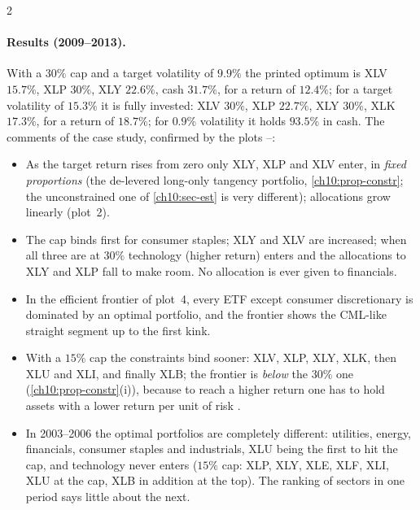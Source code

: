 \begin{paracol}{2}
\paragraph{Results (2009--2013).} With a $30\%$ cap and a target volatility of $9.9\%$ the printed optimum is XLV $15.7\%$,
XLP $30\%$, XLY $22.6\%$, cash $31.7\%$, for a return of $12.4\%$; for a target volatility of $15.3\%$ it is fully
invested: XLV $30\%$, XLP $22.7\%$, XLY $30\%$, XLK $17.3\%$, for a return of $18.7\%$; for $0.9\%$ volatility it
holds $93.5\%$ in cash. The comments of the case study, confirmed by the plots --:
\begin{itemize}
  \item As the target return rises from zero only XLY, XLP and XLV enter, in \emph{fixed proportions} (the de-levered
        long-only tangency portfolio, \cref{ch10:prop-constr}; the unconstrained one of \cref{ch10:sec-est} is very
        different); allocations grow linearly (plot~2).
  \item The cap binds first for consumer staples; XLY and XLV are increased; when all three are at $30\%$ technology
        (higher return) enters and the allocations to XLY and XLP fall to make room. No allocation is ever given to financials.
  \item In the efficient frontier of plot~4, every ETF except consumer discretionary is dominated by an optimal
        portfolio, and the frontier shows the CML-like straight segment up to the first kink.
  \item With a $15\%$ cap the constraints bind sooner: XLV, XLP, XLY, XLK, then XLU and XLI, and finally XLB; the frontier is
        \emph{below} the $30\%$ one (\cref{ch10:prop-constr}(i)), because to reach a higher return one has to
        hold assets with a lower return per unit of risk .
  \item In 2003--2006 the optimal portfolios are completely different: utilities, energy, financials, consumer
        staples and industrials, XLU being the first to hit the cap, and technology never enters ($15\%$ cap:
        XLP, XLY, XLE, XLF, XLI, XLU at the cap, XLB in addition at the top). The ranking of sectors in one period says
        little about the next.
\end{itemize}


\end{paracol}
